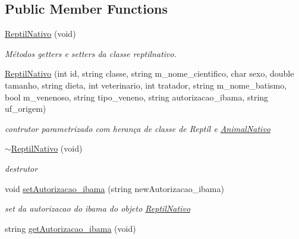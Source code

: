 \subsection*{Public Member Functions}
\begin{DoxyCompactItemize}
\item 
\mbox{\label{class_reptil_nativo_a0ef098c7241194090fbef710c67d8a2b}} 
\mbox{\hyperlink{class_reptil_nativo_a0ef098c7241194090fbef710c67d8a2b}{Reptil\+Nativo}} (void)
\begin{DoxyCompactList}\small\item\em Métodos getters e setters da classe reptilnativo. \end{DoxyCompactList}\item 
\mbox{\label{class_reptil_nativo_a66cbb2fbfc743de0388a3d73df7ea974}} 
\mbox{\hyperlink{class_reptil_nativo_a66cbb2fbfc743de0388a3d73df7ea974}{Reptil\+Nativo}} (int id, string classe, string m\+\_\+nome\+\_\+cientifico, char sexo, double tamanho, string dieta, int veterinario, int tratador, string m\+\_\+nome\+\_\+batismo, bool m\+\_\+venenoso, string tipo\+\_\+veneno, string autorizacao\+\_\+ibama, string uf\+\_\+origem)
\begin{DoxyCompactList}\small\item\em contrutor parametrizado com herança de classe de Reptíl e \mbox{\hyperlink{class_animal_nativo}{Animal\+Nativo}} \end{DoxyCompactList}\item 
\mbox{\label{class_reptil_nativo_a62ca9887ac915a23e445eee4a70d1bcd}} 
\mbox{\hyperlink{class_reptil_nativo_a62ca9887ac915a23e445eee4a70d1bcd}{$\sim$\+Reptil\+Nativo}} (void)
\begin{DoxyCompactList}\small\item\em destrutor \end{DoxyCompactList}\item 
void \mbox{\hyperlink{class_reptil_nativo_a2d73a698f46933fd3825c3ec1bfee7fd}{set\+Autorizacao\+\_\+ibama}} (string new\+Autorizacao\+\_\+ibama)
\begin{DoxyCompactList}\small\item\em set da autorizacao do ibama do objeto \mbox{\hyperlink{class_reptil_nativo}{Reptil\+Nativo}} \end{DoxyCompactList}\item 
string \mbox{\hyperlink{class_reptil_nativo_a1d02eb86a63e08f6c89e021f005ca661}{get\+Autorizacao\+\_\+ibama}} (void)

\end{DoxyCompactItemize}
